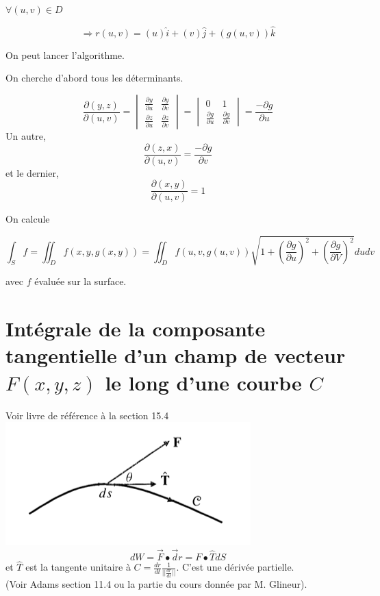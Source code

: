 $\forall (u,v) \in D $


\[\Rightarrow r (u,v) = (u)\hat i+(v)\hat j+(g(u,v))\hat k\]

On peut lancer l'algorithme.

On cherche d'abord tous les déterminants.

\[\frac{\partial (y,z)}{\partial (u,v)} =
\begin{vmatrix}
\frac{\partial y}{\partial u}& \frac{\partial y}{\partial v}\\
\frac{\partial z}{\partial u}& \frac{\partial z}{\partial v}
\end{vmatrix} =
\begin{vmatrix}
0&1\\
\frac{\partial g}{\partial u}&\frac{\partial g}{\partial v}
\end{vmatrix}
= \frac{-\partial g}{\partial u}\]
Un autre,
\[\frac{\partial (z,x)}{\partial (u,v)} = \frac{-\partial g}{\partial v}\]
et le dernier,
\[\frac{\partial (x,y)}{\partial (u,v)} = 1\]

On calcule

\[\int_S f = \iint_D f(x,y,g(x,y)) = \iint_D f(u,v,g(u,v))\sqrt{1+(\frac{\partial g}{\partial u})^2 +(\frac{\partial g}{\partial V})^2 } dudv
\]

avec $f$ évaluée sur la surface.

\section{Intégrale de la composante tangentielle d'un champ de vecteur $F(x,y,z)$ le long d'une courbe $C$}

Voir livre de référence à la section 15.4\\


\includegraphics[scale=0.5]{vec1.png}\\

\[dW = \vec F\bullet \vec dr = F\bullet \hat{T} dS\]
et $\hat{T}$ est la tangente unitaire à $C=\frac{dr}{dt}\frac{1}{||\frac{dr}{dt}||}$. C'est une dérivée partielle.\\
(Voir Adams section 11.4 ou la partie du cours donnée par M. Glineur).


